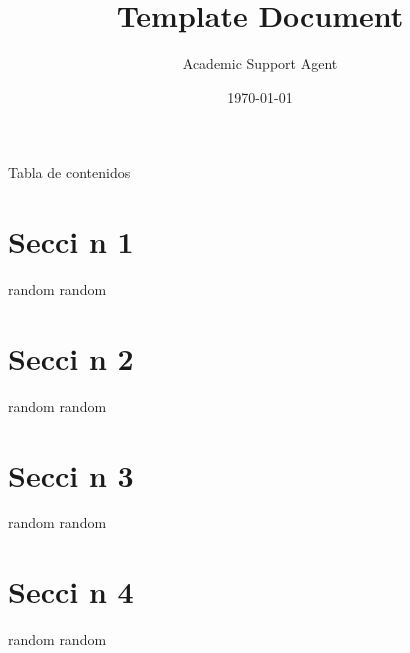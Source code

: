 \documentclass{article}
\title{Template Document}
\author{Academic Support Agent}
\date{\today}
\begin{document}
\maketitle

\begin{frame}{Tabla de contenidos}
    
\end{frame}

\section{Secci n 1}

\begin{frame}{random}
    random
\end{frame}

\section{Secci n 2}

\begin{frame}{random}
    random
\end{frame}

\section{Secci n 3}

\begin{frame}{random}
    random
\end{frame}

\section{Secci n 4}

\begin{frame}{random}
    random
\end{frame}
\end{document}
